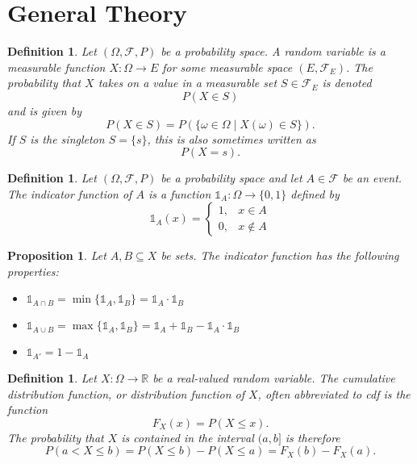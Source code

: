 \documentclass[1pt]{report}
\newtheorem{prop}[thm]{Proposition}
\newtheorem{defn}[thm]{Definition}
\newcommand{\Rone}{\mathbb{R}}
\newcommand{\R}{\Rone}
\newcommand{\id}{\mathds{1}}
\newcommand{\<}{\langle}
\renewcommand{\>}{\rangle}
\newcommand{\FF}{\mathcal{F}}
\begin{document}
\section{General Theory}
\begin{defn}\label{def:randomvariable}
Let $(\Omega, \FF, P)$ be a probability space. A \emph{random variable} is a measurable function $X : \Omega \to E$ for some measurable space $(E, \FF_E)$. The probability that $X$ takes on a value in a measurable set $S \in \FF_E$ is denoted
$$P(X \in S)$$
and is given by
$$P(X \in S) = P\left(\{\omega \in \Omega \mid X(\omega) \in S\}\right).$$
If $S$ is the singleton $S = \{s\}$, this is also sometimes written as
$$P(X = s).$$
\end{defn}
\begin{defn}\label{def:indicator}
Let $(\Omega, \FF, P)$ be a probability space and let $A \in \FF$ be an event. The \emph{indicator function} of $A$ is a function $\id_A : \Omega \to \{0, 1\}$ defined by
$$\id_A(x) = \begin{cases} 1, & x \in A \\ 0, & x \not\in A\end{cases}$$
\end{defn}
\begin{prop}\label{prop:indicatorproperties}
Let $A, B \subseteq X$ be sets. The indicator function has the following properties:
\begin{itemize}
\item $\id_{A\cap B} = \min\{\id_A, \id_B\} = \id_A \cdot \id_B$
\item $\id_{A\cup B} = \max\{\id_A, \id_B\} = \id_A + \id_B - \id_A\cdot \id_B$
\item $\id_{A'} = 1- \id_A$
\end{itemize}
\end{prop}
\begin{defn}\label{def:cdf}
Let $X:\Omega \to \R$ be a real-valued random variable. The \emph{cumulative distribution function}, or \emph{distribution function} of $X$, often abbreviated to \emph{cdf} is the function
$$F_X(x) = P(X \leq x).$$
The probability that $X$ is contained in the interval $(a,b]$ is therefore
$$P(a < X \leq b) = P(X \leq b) - P(X\leq a) = F_X(b) - F_X(a).$$
\end{defn}
\end{document}

